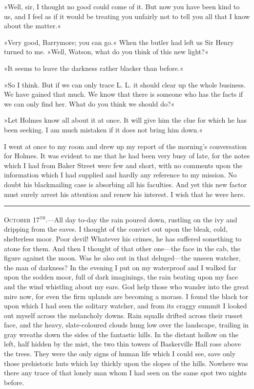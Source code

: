 »Well, sir, I thought no good could come of it. But now you have been kind to us, and I feel as if it would be treating you unfairly not to tell you all that I know about the matter.«

»Very good, Barrymore; you can go.« When the butler had left us Sir Henry turned to me. »Well, Watson, what do you think of this new light?«

»It seems to leave the darkness rather blacker than before.«

»So I think. But if we can only trace L. L. it should clear up the whole business. We have gained that much. We know that there is someone who has the facts if we can only find her. What do you think we should do?«

»Let Holmes know all about it at once. It will give him the clue for which he has been seeking. I am much mistaken if it does not bring him down.«

I went at once to my room and drew up my report of the morning's conversation for Holmes. It was evident to me that he had been very busy of late, for the notes which I had from Baker Street were few and short, with no comments upon the information which I had supplied and hardly any reference to my mission. No doubt his blackmailing case is absorbing all his faculties. And yet this new factor must surely arrest his attention and renew his interest. I wish that he were here.

\noindent\hfil\rule{0.5\textwidth}{.4pt}\hfil 

\textsc{October 17\textsuperscript{th}.}—All day to-day the rain poured down, rustling on the ivy and dripping from the eaves. I thought of the convict out upon the bleak, cold, shelterless moor. Poor devil! Whatever his crimes, he has suffered something to atone for them. And then I thought of that other one—the face in the cab, the figure against the moon. Was he also out in that deluged—the unseen watcher, the man of darkness? In the evening I put on my waterproof and I walked far upon the sodden moor, full of dark imaginings, the rain beating upon my face and the wind whistling about my ears. God help those who wander into the great mire now, for even the firm uplands are becoming a morass. I found the black tor upon which I had seen the solitary watcher, and from its craggy summit I looked out myself across the melancholy downs. Rain squalls drifted across their russet face, and the heavy, slate-coloured clouds hung low over the landscape, trailing in gray wreaths down the sides of the fantastic hills. In the distant hollow on the left, half hidden by the mist, the two thin towers of Baskerville Hall rose above the trees. They were the only signs of human life which I could see, save only those prehistoric huts which lay thickly upon the slopes of the hills. Nowhere was there any trace of that lonely man whom I had seen on the same spot two nights before.

